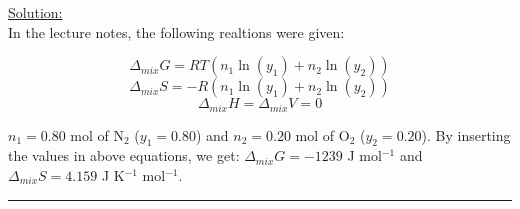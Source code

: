 \noindent
\underline{Solution:}\\

In the lecture notes, the following realtions were given:

$$\Delta_{mix} G = RT\left(n_1\ln(y_1) + n_2\ln(y_2)\right)$$
$$\Delta_{mix} S = -R\left(n_1\ln(y_1) + n_2\ln(y_2)\right)$$
$$\Delta_{mix} H = \Delta_{mix}V = 0$$

$n_1 = 0.80$ mol of N$_2$ ($y_1 = 0.80$) and $n_2 = 0.20$ mol of O$_2$ ($y_2 = 0.20$). By inserting the values in above equations, we get: $\Delta_{mix}G = -1239$ J mol$^{-1}$ and $\Delta_{mix}S = 4.159$ J K$^{-1}$ mol$^{-1}$.

\hrule\vspace{0.5cm}

